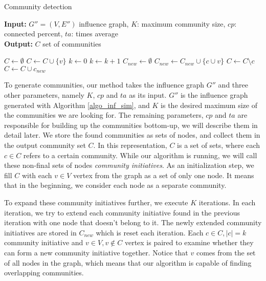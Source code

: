 \documentclass[pdflatex,sn-mathphys-ay]{sn-jnl}
\begin{document}
\begin{algorithm}[ht]
\caption{Community detection}
\label{algo_comm_det}
\textbf{Input:} $G'' = (V,E'')$ influence graph, $K$: maximum community size, $cp$: connected percent, $ta$: times average
\\
\textbf{Output:} $C$ set of communities
\begin{algorithmic}[1]
    \State $C \gets \emptyset$
        \State $C \gets C \cup \{v\}$
    \EndFor
    \State $k \gets 0$
        \State $k \gets k + 1$
        \State $C_{new} \gets \emptyset$
                \State $C_{new} \gets C_{new} \cup \{c \cup v\}$
            \EndIf
        \EndFor
                \State $C \gets C \setminus c$
            \EndIf
        \EndFor
            \State $C \gets C \cup c_{new}$
        \EndFor
    \EndWhile
\end{algorithmic}
\end{algorithm}

To generate communities, our method takes the influence graph $G''$ and three other parameters, namely $K$, $cp$ and $ta$ as its input. $G''$ is the influence graph generated with Algorithm \ref{algo_inf_sim}, and $K$ is the desired maximum size of the communities we are looking for. The remaining parameters, $cp$ and $ta$ are responsible for building up the communities bottom-up, we will describe them in detail later.
We store the found communities as sets of nodes, and collect them in the output community set $C$. In this representation, $C$ is a set of sets, where each $c \in C$ refers to a certain community. While our algorithm is running, we will call these non-final sets of nodes \textit{community initiatives}. As an initialization step, we fill $C$ with each $v \in V$ vertex from the graph as a set of only one node. It means that in the beginning, we consider each node as a separate community.

To expand these community initiatives further, we execute $K$ iterations. In each iteration, we try to extend each community initiative found in the previous iteration with one node that doesn't belong to it. The newly extended community initiatives are stored in $C_{new}$ which is reset each iteration. Each $c \in C, |c|=k$ community initiative and $v \in V, v \notin C$ vertex is paired to examine whether they can form a new community initiative together. Notice that $v$ comes from the set of all nodes in the graph, which means that our algorithm is capable of finding overlapping communities.
\end{document}
